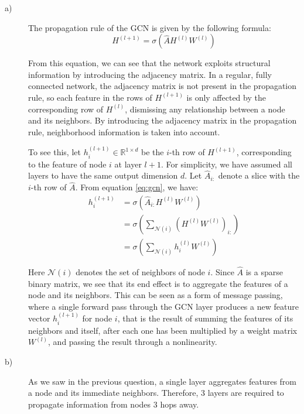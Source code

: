 \documentclass{article}
\begin{document}
\begin{description}
\item[a)] The propagation rule of the GCN is given by the following formula:
\begin{equation}
H^{(l+1)} = \sigma(\hat{A}H^{(l)}W^{(l)})
\label{eq:gcn}
\end{equation}

From this equation, we can see that the network exploits structural information by introducing the adjacency matrix. In a regular, fully connected network, the adjacency matrix is not present in the propagation rule, so each feature in the rows of $H^{(l+1)}$ is only affected by the corresponding row of $H^{(l)}$, dismissing any relationship between a node and its neighbors. By introducing the adjacency matrix in the propagation rule, neighborhood information is taken into account.

To see this, let $h_i^{(l+1)}\in\mathbb{R}^{1\times d}$ be the $i$-th row of $H^{(l+1)}$, corresponding to the feature of node $i$ at layer $l+1$. For simplicity, we have assumed all layers to have the same output dimension $d$. Let $\hat{A}_{i:}$ denote a slice with the $i$-th row of $\hat{A}$. From equation \ref{eq:gcn}, we have:
\begin{align*}
h_i^{(l+1)} &=  \sigma\left(\hat{A}_{i:}H^{(l)}W^{(l)} \right)\\
&= \sigma\left(\sum_{\mathcal{N}(i)} \left(H^{(l)}W^{(l)} \right)_{i:} \right)\\
&= \sigma\left(\sum_{\mathcal{N}(i)} h_i^{(l)}W^{(l)}\right)
\end{align*}

Here $\mathcal{N}(i)$ denotes the set of neighbors of node $i$. Since $\hat{A}$ is a sparse binary matrix, we see that its end effect is to aggregate the features of a node and its neighbors. This can be seen as a form of message passing, where a single forward pass through the GCN layer produces a new feature vector $h_i^{(l+1)}$ for node $i$, that is the result of summing the features of its neighbors and itself, after each one has been multiplied by a weight matrix $W^{(l)}$, and passing the result through a nonlinearity.

\item[b)] As we saw in the previous question, a single layer aggregates features from a node and its immediate neighbors. Therefore, 3 layers are required to propagate information from nodes 3 hops away.
\end{description}
\end{document}
